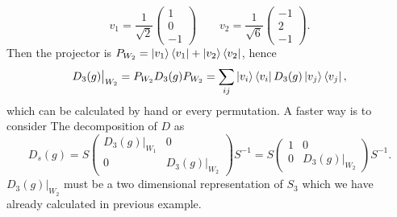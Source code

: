 \documentclass[12pt]{book}
\theoremstyle{plain}
\theoremstyle{definition}
\theoremstyle{remark}
\begin{document}
\[v_1 = \frac{1}{\sqrt{2}}\begin{pmatrix}1\\0\\-1\end{pmatrix}\qquad v_2 = \frac{1}{\sqrt{6}}\begin{pmatrix}-1\\2\\-1\end{pmatrix}.\]
Then the projector is $P_{W_2} = \ket{v_1}\bra{v_1} + \ket{v_2}\bra{v_2}$, hence
\[D_3(g)\big|_{W_2} = P_{W_2}D_3(g)P_{W_2} = \sum_{ij} \ket{v_i}\bra{v_i}D_3(g)\ket{v_j}\bra{v_j},\]
which can be calculated by hand or every permutation. A faster way is to consider The decomposition of $D$ as
\[D_s(g) = S \begin{pmatrix}D_3(g)\big|_{W_1}&0\\0& D_3(g)\big|_{W_2} \end{pmatrix}S^{-1} =S \begin{pmatrix}1&0\\0& D_3(g)\big|_{W_2} \end{pmatrix}S^{-1}.\]
$D_3(g)\big|_{W_2} $ must be a two dimensional representation of $S_3$ which we have already calculated in previous example.
 
\end{document}

